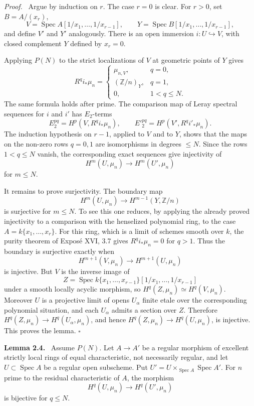 \documentclass[12pt]{article}
\newcommand{\ZZ}{\mathbb Z}
\DeclareMathOperator{\Spec}{Spec}
\newcommand{\qedtext}{\hfill\(\square\)}
\newenvironment{statement}[1]{\par\medskip\noindent\textbf{#1.}\ }{\par\medskip}
\newenvironment{prooftext}[1][Proof]{\par\noindent\emph{#1.}\ }{\par\medskip}
\begin{document}
\begin{prooftext}
Argue by induction on $r$. The case $r=0$ is clear. For $r>0$, set $B=A/(x_r)$,
\[
   V=\Spec A[1/x_1,\ldots,1/x_{r-1}],\qquad
   Y=\Spec B[1/x_1,
\ldots,1/x_{r-1}],
\]
and define $V'$ and $Y'$ analogously. There is an open immersion $i:U\hookrightarrow V$, with closed complement $Y$ defined by $x_r=0$.

Applying $P(N)$ to the strict localizations of $V$ at geometric points of $Y$ gives
\begin{equation}
R^qi_*\mu_n=
\begin{cases}
\mu_{n,V},&q=0,\\
(\ZZ/n)_Y,&q=1,\\
0,&1<q\leq N.
\end{cases} \tag{2.3}
\end{equation}
The same formula holds after prime. The comparison map of Leray spectral sequences for $i$ and $i'$ has $E_2$-terms
\[
   E_2^{pq}=H^p(V,R^qi_*\mu_n),\qquad {E'}_2^{pq}=H^p(V',R^qi'_*
\mu_n).
\]
The induction hypothesis on $r-1$, applied to $V$ and to $Y$, shows that the maps on the non-zero rows $q=0,1$ are isomorphisms in degrees $\leq N$. Since the rows $1<q\leq N$ vanish, the corresponding exact sequences give injectivity of
\[
   H^m(U,\mu_n)\to H^m(U',\mu_n)
\]
for $m\leq N$.

It remains to prove surjectivity. The boundary map
\[
   H^m(U,\mu_n)\longrightarrow H^{m-1}(Y,\ZZ/n)
\]
is surjective for $m\leq N$. To see this one reduces, by applying the already proved injectivity to a comparison with the henselized polynomial ring, to the case $A=k\{x_1,\ldots,x_r\}$. For this ring, which is a limit of schemes smooth over $k$, the purity theorem of Expos\'e XVI, 3.7 gives $R^qi_*\mu_n=0$ for $q>1$. Thus the boundary is surjective exactly when
\[
   H^{m+1}(V,\mu_n)\longrightarrow H^{m+1}(U,\mu_n)
\]
is injective. But $V$ is the inverse image of
\[
   Z=\Spec k\{x_1,\ldots,x_{r-1}\}[1/x_1,
\ldots,1/x_{r-1}]
\]
under a smooth locally acyclic morphism, so $H^q(Z,\mu_n)\simeq H^q(V,\mu_n)$. Moreover $U$ is a projective limit of opens $U_\alpha$ finite etale over the corresponding polynomial situation, and each $U_\alpha$ admits a section over $Z$. Therefore $H^q(Z,\mu_n)\to H^q(U_\alpha,\mu_n)$, and hence $H^q(Z,\mu_n)\to H^q(U,\mu_n)$, is injective. This proves the lemma. \qedtext
\end{prooftext}

\begin{statement}{Lemma 2.4}
Assume $P(N)$. Let $A\to A'$ be a regular morphism of excellent strictly local rings of equal characteristic, not necessarily regular, and let $U\subset\Spec A$ be a regular open subscheme. Put $U'=U\times_{\Spec A}\Spec A'$. For $n$ prime to the residual characteristic of $A$, the morphism
\[
   H^q(U,\mu_n)\longrightarrow H^q(U',\mu_n)
\]
is bijective for $q\leq N$.
\end{statement}
\end{document}
